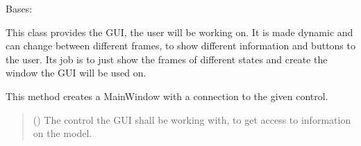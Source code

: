 \documentclass[letterpaper,10pt,english]{sphinxmanual}
\begin{document}
\begin{fulllineitems}
\label{\detokenize{apidoc/src.osm_configurator.view.states:src.osm_configurator.view.states.main_window.MainWindow}}
\pysigstartsignatures
{}
\pysigstopsignatures
\sphinxAtStartPar
Bases: 

\sphinxAtStartPar
This class provides the GUI, the user will be working on.
It is made dynamic and can change between different frames, to show different information and buttons to the user.
Its job is to just show the frames of different states and create the window the GUI will be used on.

\begin{fulllineitems}
\label{\detokenize{apidoc/src.osm_configurator.view.states:src.osm_configurator.view.states.main_window.MainWindow.__init__}}
\pysigstartsignatures
{}
\pysigstopsignatures
\sphinxAtStartPar
This method creates a MainWindow with a connection to the given control.
\begin{quote}\begin{description}
\sphinxAtStartPar
{} ({\hyperref[\detokenize{apidoc/src.osm_configurator.control:src.osm_configurator.control.control_interface.IControl}]{}}) \textendash{} The control the GUI shall be working with, to get access to information on the model.

\end{description}\end{quote}

\end{fulllineitems}



\end{fulllineitems}
\end{document}
